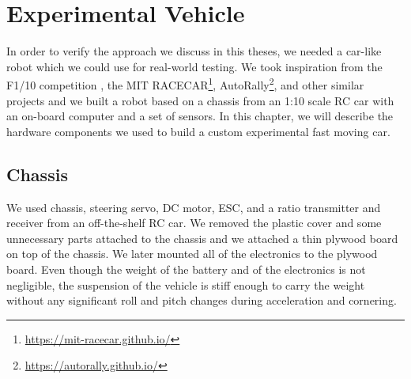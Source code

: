\chapter{Experimental Vehicle}

\label{chapter:hardware}

In order to verify the approach we discuss in this theses, we needed a car-like robot which we could use for real-world testing. We took inspiration from the F1/10 competition \cite{F1/10}, the MIT RACECAR\footnote{\url{https://mit-racecar.github.io/}}, AutoRally\footnote{\url{https://autorally.github.io/}}, and other similar projects and we built a robot based on a chassis from an 1:10 scale \gls{RC} car with an on-board computer and a set of sensors. In this chapter, we will describe the hardware components we used to build a custom experimental fast moving car.

\section{Chassis}
\label{sec:chassis}

We used chassis, steering servo, \gls{DC} motor, \gls{ESC}, and a ratio transmitter and receiver from an off-the-shelf \gls*{RC} car. We removed the plastic cover and some unnecessary parts attached to the chassis and we attached a thin plywood board on top of the chassis. We later mounted all of the electronics to the plywood board. Even though the weight of the battery and of the electronics is not negligible, the suspension of the vehicle is stiff enough to carry the weight without any significant roll and pitch changes during acceleration and cornering.


